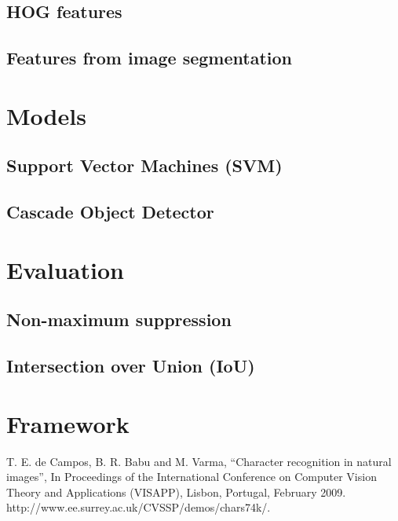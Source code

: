 \documentclass[conference]{IEEEtran}
\begin{document}
\subsection{HOG features}

\subsection{Features from image segmentation}

\section{Models}

\subsection{Support Vector Machines (SVM)}

\subsection{Cascade Object Detector}

\section{Evaluation}

\subsection{Non-maximum suppression}

\subsection{Intersection over Union (IoU)}

\section{Framework}

\begin{thebibliography}{00}
 T. E. de Campos, B. R. Babu and M. Varma, ``Character recognition in natural images'', In Proceedings of the International Conference on Computer Vision Theory and Applications (VISAPP), Lisbon, Portugal, February 2009. http://www.ee.surrey.ac.uk/CVSSP/demos/chars74k/.
\end{thebibliography}
\end{document}
